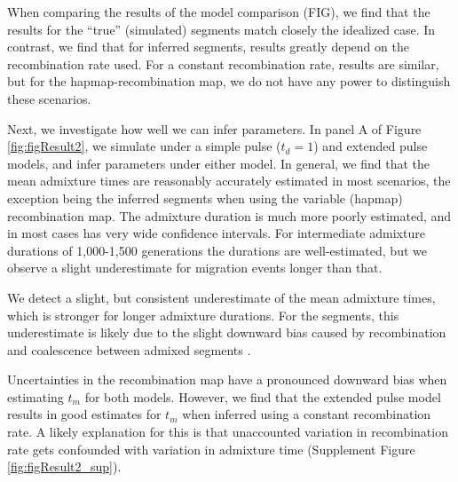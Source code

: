 \documentclass[11pt]{article}
\begin{document}
When comparing the results of the model comparison (FIG), we find that the results for the ``true'' (simulated) segments match closely the idealized case. In contrast, we find that for inferred segments, results greatly depend on the recombination rate used. For a constant recombination rate, results are similar, but for the hapmap-recombination map, we do not have any power to distinguish these scenarios. 


Next, we investigate how well we can infer parameters. In panel A of Figure \ref{fig:figResult2}, we simulate under a simple pulse ($t_d=1$) and extended pulse models, and infer parameters under either model. In general, we find that the mean admixture times are reasonably accurately estimated in most scenarios, the exception being the inferred segments when using the variable (hapmap) recombination map. The admixture duration is much more poorly estimated, and in most cases has very wide confidence intervals. For intermediate admixture durations of 1,000-1,500 generations the durations are well-estimated, but we observe a slight underestimate for migration events longer than that.
 

We detect a slight, but consistent underestimate of the mean admixture times, which is stronger for longer admixture durations. For the segments, this underestimate is likely due to the slight downward bias caused by recombination and coalescence between admixed segments \cite{liang_lengths_2014}. 

Uncertainties in the recombination map have a pronounced downward bias when estimating $t_m$ for both models. However, we find that the extended pulse model results in good estimates for $t_m$ when inferred using a constant recombination rate. A likely explanation for this is that unaccounted variation in recombination rate gets confounded with variation in admixture time (Supplement Figure \ref{fig:figResult2_sup}).
\end{document}
